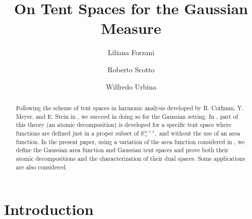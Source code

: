 \documentclass[leqno,11pt]{amsart}
\theoremstyle{plain}
\theoremstyle{remark}
\begin{document}
\title{On Tent Spaces for the Gaussian Measure}
\author{Liliana Forzani}
\address{Facultad de Ingeniería Química and CONICET, Santiago del Estero 2829, Santa Fe, Argentina.}
\author{Roberto Scotto}
\address{Facultad de Ingeniería Química, Santiago del Estero 2829, Santa Fe, Argentina.}
\author{Wilfredo Urbina}
\address{Department of Mathematics and Actuarial Sciences, Roosevelt University, 430 S Michigan Ave. Chicago, IL 60605, USA. }
%
%



 
\begin{abstract} Following the scheme of tent spaces in harmonic analysis developed by R. Coifman, Y. Meyer, and E. Stein in \cite{cms}, we succeed in doing so for the Gaussian setting. In \cite{MNP}, part of this theory (an atomic decomposition) is developed for a specific tent space where functions are defined just in a proper subset of $\mathbb{R}^{n+1}_+,$ and without the use of an area function. In the present paper, using a variation of the area function considered in \cite{FSU}, we define the Gaussian area function and Gaussian tent spaces and prove both their atomic decompositions and the characterization of their dual spaces. Some applications are also considered.
\end{abstract}
 \maketitle

\section{Introduction}
\label{sec:1}
\end{document}
